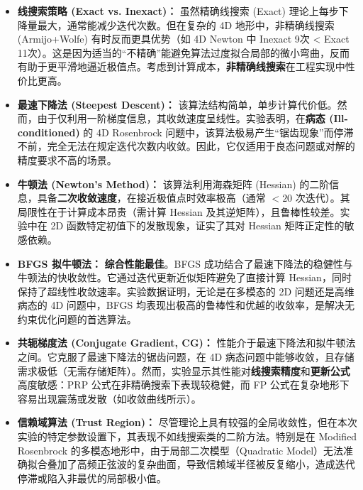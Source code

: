\documentclass[a4paper,12pt]{article}
\begin{document}
\begin{itemize}
    \item \textbf{线搜索策略 (Exact vs. Inexact)：} 
    虽然精确线搜索 (Exact) 理论上每步下降量最大，通常能减少迭代次数。但在复杂的 4D 地形中，非精确线搜索 (Armijo+Wolfe) 有时反而更具优势（如 4D Newton 中 Inexact 9次 < Exact 11次）。这是因为适当的“不精确”能避免算法过度拟合局部的微小弯曲，反而有助于更平滑地逼近极值点。考虑到计算成本，\textbf{非精确线搜索}在工程实现中性价比更高。

    \item \textbf{最速下降法 (Steepest Descent)：} 
    该算法结构简单，单步计算代价低。然而，由于仅利用一阶梯度信息，其收敛速度呈线性。实验表明，在\textbf{病态 (Ill-conditioned)} 的 4D Rosenbrock 问题中，该算法极易产生“锯齿现象”而停滞不前，完全无法在规定迭代次数内收敛。因此，它仅适用于良态问题或对解的精度要求不高的场景。

    \item \textbf{牛顿法 (Newton's Method)：} 
    该算法利用海森矩阵 (Hessian) 的二阶信息，具备\textbf{二次收敛速度}，在接近极值点时效率极高（通常 $<20$ 次迭代）。其局限性在于计算成本昂贵（需计算 Hessian 及其逆矩阵），且鲁棒性较差。实验中在 2D 函数特定初值下的发散现象，证实了其对 Hessian 矩阵正定性的敏感依赖。

    \item \textbf{BFGS 拟牛顿法：} 
    \textbf{综合性能最佳}。BFGS 成功结合了最速下降法的稳健性与牛顿法的快收敛性。它通过迭代更新近似矩阵避免了直接计算 Hessian，同时保持了超线性收敛速率。实验数据证明，无论是在多模态的 2D 问题还是高维病态的 4D 问题中，BFGS 均表现出极高的鲁棒性和优越的收敛率，是解决无约束优化问题的首选算法。

    \item \textbf{共轭梯度法 (Conjugate Gradient, CG)：}
    性能介于最速下降法和拟牛顿法之间。它克服了最速下降法的锯齿问题，在 4D 病态问题中能够收敛，且存储需求极低（无需存储矩阵）。然而，实验显示其性能对\textbf{线搜索精度}和\textbf{更新公式}高度敏感：PRP 公式在非精确搜索下表现较稳健，而 FP 公式在复杂地形下容易出现震荡或发散（如收敛曲线所示）。


    \item \textbf{信赖域算法 (Trust Region)：}
    尽管理论上具有较强的全局收敛性，但在本次实验的特定参数设置下，其表现不如线搜索类的二阶方法。特别是在 Modified Rosenbrock 的多模态地形中，由于局部二次模型（Quadratic Model）无法准确拟合叠加了高频正弦波的复杂曲面，导致信赖域半径被反复缩小，造成迭代停滞或陷入非最优的局部极小值。

\end{itemize}
\end{document}
